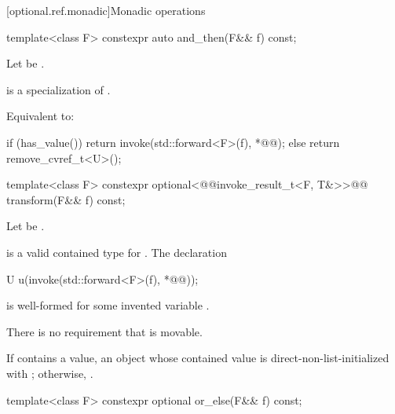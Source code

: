 [optional.ref.monadic]{Monadic operations}

%
\begin{itemdecl}
template<class F>
  constexpr auto and_then(F&& f) const;
\end{itemdecl}

\begin{itemdescr}
\pnum
Let  be .

\pnum
\mandates
{} is a specialization of .

\pnum
\effects
Equivalent to:
\begin{codeblock}
if (has_value()) {
  return invoke(std::forward<F>(f), *@@);
} else {
  return remove_cvref_t<U>();
}
\end{codeblock}
\end{itemdescr}

%
\begin{itemdecl}
template<class F>
  constexpr optional<@@invoke_result_t<F, T&>>@\removed{>}@ transform(F&& f) const;
\end{itemdecl}

\begin{itemdescr}
\pnum
Let  be .

\pnum
\mandates
{} is a valid contained type for . The declaration
\begin{codeblock}
U u(invoke(std::forward<F>(f), *@@));
\end{codeblock}
is well-formed for some invented variable .
\begin{note}
There is no requirement that  is movable.
\end{note}

\pnum
\returns
If  contains a value, an  object whose contained value is direct-non-list-initialized with ; otherwise, .
\end{itemdescr}

%
\begin{itemdecl}
template<class F>
  constexpr optional or_else(F&& f) const;
\end{itemdecl}

